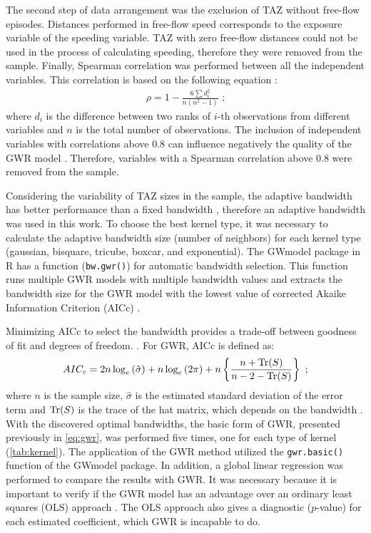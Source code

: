 The second step of data arrangement was the exclusion of TAZ without free-flow episodes. Distances performed in free-flow speed corresponds to the exposure variable of the speeding variable. TAZ with zero free-flow distances could not be used in the process of calculating speeding, therefore they were removed from the sample. Finally, Spearman correlation was performed between all the independent variables. This correlation is based on the following equation \cite{Dodge2010}: \begin{align}
    \rho = 1 - \frac{6 \sum d_i^2}{n \left( n^2 - 1\right)} \mbox{ ;}
\end{align} where $d_i$ is the difference between two ranks of $i$-th observations from different variables and $n$ is the total number of observations. The inclusion of independent variables with correlations above 0.8 can influence negatively the quality of the GWR model \cite{Gollini2013}. Therefore, variables with a Spearman correlation above 0.8 were removed from the sample. 

Considering the variability of TAZ sizes in the sample, the adaptive bandwidth has better performance than a fixed bandwidth \cite{Huang2018}, therefore an adaptive bandwidth was used in this work. To choose the best kernel type, it was necessary to calculate the adaptive bandwidth size (number of neighbors) for each kernel type (gaussian, bisquare, tricube, boxcar, and exponential). The GWmodel package in R has a function (\verb|bw.gwr()|) for automatic bandwidth selection. This function runs multiple GWR models with multiple bandwidth values and extracts the bandwidth size for the GWR model with the lowest value of corrected Akaike Information Criterion (AICc) \cite{Gollini2013}.

Minimizing AICc to select the bandwidth provides a trade-off between goodness of fit and degrees of freedom. \cite{Fotheringham2002}. For GWR, AICc is defined as: \begin{align}
    AIC_c = 2n\log_{e}\left(\hat\sigma\right) + n \log_{e}\left(2\pi\right) + n\left\{\frac{n + \operatorname{Tr}(S)}{n - 2 - \operatorname{Tr}(S)}\right\} \mbox{ ;}
\end{align} where $n$ is the sample size, $\hat\sigma$ is the estimated standard deviation of the error term and $\operatorname{Tr}(S)$ is the trace of the hat matrix, which depends on the bandwidth \cite{Fotheringham2002}. With the discovered optimal bandwidths, the basic form of GWR, presented previously in \autoref{eq:gwr}, was performed five times, one for each type of kernel (\autoref{tab:kernel}). The application of the GWR method utilized the \verb|gwr.basic()| function of the GWmodel package. In addition, a global linear regression was performed to compare the results with GWR. It was necessary because it is important to verify if the GWR model has an advantage over an ordinary least squares (OLS) approach \cite{Brunsdon2010}. The OLS approach also gives a diagnostic ($p$-value) for each estimated coefficient, which GWR is incapable to do.

